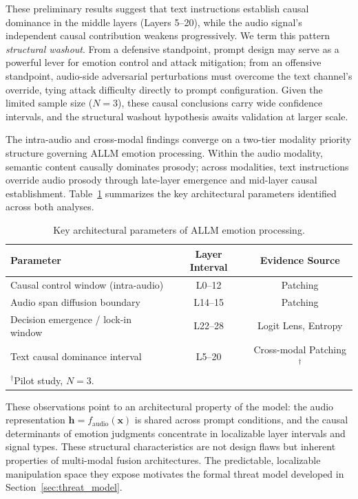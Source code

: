 These preliminary results suggest that text instructions establish causal dominance in the middle layers (Layers 5--20), while the audio signal's independent causal contribution weakens progressively. We term this pattern \textit{structural washout}. From a defensive standpoint, prompt design may serve as a powerful lever for emotion control and attack mitigation; from an offensive standpoint, audio-side adversarial perturbations must overcome the text channel's override, tying attack difficulty directly to prompt configuration. Given the limited sample size ($N=3$), these causal conclusions carry wide confidence intervals, and the structural washout hypothesis awaits validation at larger scale.


The intra-audio and cross-modal findings converge on a two-tier modality priority structure governing ALLM emotion processing. Within the audio modality, semantic content causally dominates prosody; across modalities, text instructions override audio prosody through late-layer emergence and mid-layer causal establishment. Table~\ref{tab:arch_params} summarizes the key architectural parameters identified across both analyses.

\begin{table}[t]
\centering
\caption{Key architectural parameters of ALLM emotion processing.}
\label{tab:arch_params}
\begin{tabular}{lcc}
\toprule
\textbf{Parameter} & \textbf{Layer Interval} & \textbf{Evidence Source} \\
\midrule
Causal control window (intra-audio) & L0--12 & Patching \\
Audio span diffusion boundary & L14--15 & Patching \\
Decision emergence / lock-in window & L22--28 & Logit Lens, Entropy \\
Text causal dominance interval & L5--20 & Cross-modal Patching$^\dagger$ \\
\bottomrule
\multicolumn{3}{l}{\small $^\dagger$Pilot study, $N=3$.}
\end{tabular}
\end{table}

These observations point to an architectural property of the model: the audio representation $\mathbf{h} = f_{\text{audio}}(\mathbf{x})$ is shared across prompt conditions, and the causal determinants of emotion judgments concentrate in localizable layer intervals and signal types. These structural characteristics are not design flaws but inherent properties of multi-modal fusion architectures. The predictable, localizable manipulation space they expose motivates the formal threat model developed in Section~\ref{sec:threat_model}.
